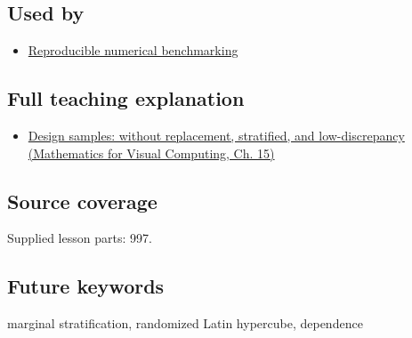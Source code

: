 \subsection{Used by}\label{appendix-1c5e85693a06-used-by}

\begin{itemize}
\tightlist
\item
  \hyperref[appendix-b9db93e28371]{Reproducible numerical benchmarking}
\end{itemize}

\subsection{Full teaching explanation}\label{appendix-1c5e85693a06-full-teaching-explanation}

\begin{itemize}
\tightlist
\item
  \href{../02-Mathematics-for-Visual-Computing/main.pdf\#nameddest=02-foundations-ii-ch031-design-samples-without-replacement-stratified-and-low-discrepancy}{Design samples: without replacement, stratified, and low-discrepancy (Mathematics for Visual Computing, Ch. 15)}
\end{itemize}

\subsection{Source coverage}\label{appendix-1c5e85693a06-source-coverage}

Supplied lesson parts: 997.

\subsection{Future keywords}\label{appendix-1c5e85693a06-future-keywords}

marginal stratification, randomized Latin hypercube, dependence
